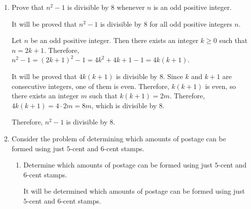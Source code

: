 \begin{enumerate}
\begin{subprove}
    The inductive step requires that the sets of the first \(n\) horses and the last \(n\) horses overlap, which means they must share at least one horse in common.
    For \(n+1\) horses, the first \(n\) horses are horses \(1, 2, \ldots, n\), and the last \(n\) horses are horses \(2, 3, \ldots, n+1\).
    These sets overlap if and only if they share at least one horse, which occurs when \(n \geq 2\).
    However, to prove \(P(2)\) from \(P(1)\) using the inductive step, we need \(n = 1\), and in this case, the sets \(\{horse 1\}\) and \(\{horse 2\}\) do not overlap.
    
    Therefore, the inductive step fails when going from \(P(1)\) to \(P(2)\), and the proof is invalid.
    This is a spoof, not a valid proof.
  \end{subprove}
  \item Prove that \(n^{2} - 1\) is divisible by \(8\) whenever \(n\) is an odd positive integer.
  \begin{subprove}
    It will be proved that \(n^{2} - 1\) is divisible by \(8\) for all odd positive integers \(n\).
    
    Let \(n\) be an odd positive integer.
    Then there exists an integer \(k \geq 0\) such that \(n = 2k + 1\).
    Therefore, \(n^{2} - 1 = (2k + 1)^{2} - 1 = 4k^{2} + 4k + 1 - 1 = 4k(k + 1)\).
    
    It will be proved that \(4k(k + 1)\) is divisible by \(8\).
    Since \(k\) and \(k + 1\) are consecutive integers, one of them is even.
    Therefore, \(k(k + 1)\) is even, so there exists an integer \(m\) such that \(k(k + 1) = 2m\).
    Therefore, \(4k(k + 1) = 4 \cdot 2m = 8m\), which is divisible by \(8\).
    
    Therefore, \(n^{2} - 1\) is divisible by \(8\).
  \end{subprove}
  \item Consider the problem of determining which amounts of postage can be formed using just \(5\)-cent and \(6\)-cent stamps.
  \begin{enumerate}
    \item Determine which amounts of postage can be formed using just \(5\)-cent and \(6\)-cent stamps.
    \begin{subprove}
      It will be determined which amounts of postage can be formed using just \(5\)-cent and \(6\)-cent stamps.
      

\end{subprove}
\end{enumerate}
\end{enumerate}
